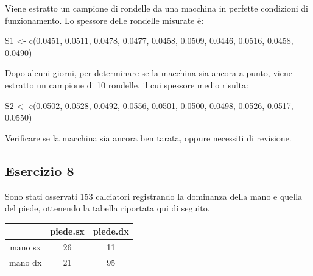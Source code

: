 \documentclass[a4paper,12pt,oneside]{book}
\newenvironment{Shaded}{\begin{snugshade}}{\end{snugshade}}
\newcommand{\FloatTok}[1]{#1}
\newcommand{\OtherTok}[1]{#1}
\newcommand{\FunctionTok}[1]{#1}
\newcommand{\NormalTok}[1]{#1}
\begin{document}
Viene estratto un campione di rondelle da una macchina in perfette condizioni di funzionamento. Lo spessore delle rondelle misurate è:

\begin{Shaded}
\begin{Highlighting}[]
\NormalTok{S1 }\OtherTok{\textless{}{-}} \FunctionTok{c}\NormalTok{(}\FloatTok{0.0451}\NormalTok{, }\FloatTok{0.0511}\NormalTok{, }\FloatTok{0.0478}\NormalTok{, }\FloatTok{0.0477}\NormalTok{, }\FloatTok{0.0458}\NormalTok{, }\FloatTok{0.0509}\NormalTok{, }\FloatTok{0.0446}\NormalTok{,}
        \FloatTok{0.0516}\NormalTok{, }\FloatTok{0.0458}\NormalTok{, }\FloatTok{0.0490}\NormalTok{)}
\end{Highlighting}
\end{Shaded}

Dopo alcuni giorni, per determinare se la macchina sia ancora a punto, viene estratto un campione di 10 rondelle, il cui spessore medio risulta:

\begin{Shaded}
\begin{Highlighting}[]
\NormalTok{S2 }\OtherTok{\textless{}{-}} \FunctionTok{c}\NormalTok{(}\FloatTok{0.0502}\NormalTok{, }\FloatTok{0.0528}\NormalTok{, }\FloatTok{0.0492}\NormalTok{, }\FloatTok{0.0556}\NormalTok{, }\FloatTok{0.0501}\NormalTok{, }\FloatTok{0.0500}\NormalTok{, }\FloatTok{0.0498}\NormalTok{,}
        \FloatTok{0.0526}\NormalTok{, }\FloatTok{0.0517}\NormalTok{, }\FloatTok{0.0550}\NormalTok{)}
\end{Highlighting}
\end{Shaded}

Verificare se la macchina sia ancora ben tarata, oppure necessiti di revisione.

\hypertarget{esercizio-8-1}{%
\subsection{Esercizio 8}\label{esercizio-8-1}}

Sono stati osservati 153 calciatori registrando la dominanza della mano e quella del piede, ottenendo la tabella riportata qui di seguito.

\begin{longtable}[]{@{}ccc@{}}
\toprule
& piede.sx & piede.dx \\
\midrule
\endhead
mano sx & 26 & 11 \\
mano dx & 21 & 95 \\
\bottomrule
\end{longtable}
\end{document}
